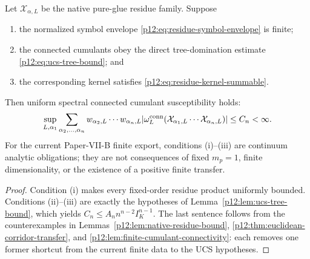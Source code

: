 \documentclass[12pt,a4paper]{article}
\begin{document}
\begin{theorem}
\label{p12:thm:native-spectral-ucs}
Let \(\mathcal X_{\alpha,L}\) be the native pure-glue residue family.  Suppose
\begin{enumerate}[label=\textnormal{(\roman*)}]
\item the normalized symbol envelope \eqref{p12:eq:residue-symbol-envelope} is finite;
\item the connected cumulants obey the direct tree-domination estimate \eqref{p12:eq:ucs-tree-bound}; and
\item the corresponding kernel satisfies \eqref{p12:eq:residue-kernel-summable}.
\end{enumerate}
Then uniform spectral connected cumulant susceptibility holds:
\begin{equation}
\label{p12:eq:ucs-closed-estimate}
\sup_{L,\alpha_1}\sum_{\alpha_2,\ldots,\alpha_n}
 w_{\alpha_2,L}\cdots w_{\alpha_n,L}
|\omega_L^{\rm conn}(\mathcal X_{\alpha_1,L}\cdots\mathcal X_{\alpha_n,L})|
\le C_n<\infty.
\end{equation}
For the current Paper-VII-B finite export, conditions (i)--(iii) are continuum analytic obligations; they are not consequences of fixed \(m_p=1\), finite dimensionality, or the existence of a positive finite transfer.
\end{theorem}
\begin{proof}
Condition (i) makes every fixed-order residue product uniformly bounded.  Conditions (ii)--(iii) are exactly the hypotheses of Lemma~\ref{p12:lem:ucs-tree-bound}, which yields \(C_n\le A_n n^{n-2}I_K^{n-1}\).  The last sentence follows from the counterexamples in Lemmas~\ref{p12:lem:native-residue-bound}, \ref{p12:thm:euclidean-corridor-transfer}, and \ref{p12:lem:finite-cumulant-connectivity}: each removes one former shortcut from the current finite data to the UCS hypotheses.
\end{proof}
\end{document}
